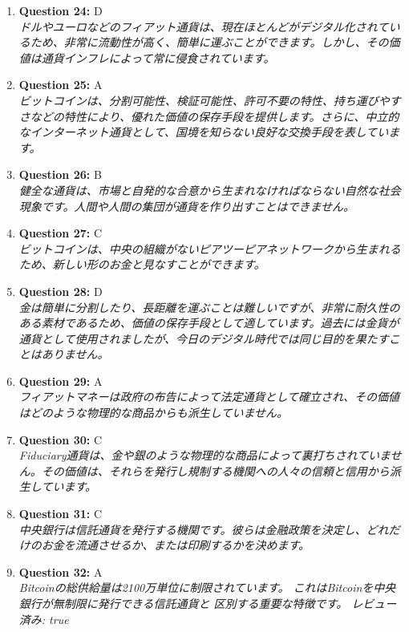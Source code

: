 \documentclass[12pt,a4paper]{article}
\begin{document}
\begin{enumerate}
\item \textbf{Question 24:} D
\\ \textit{ドルやユーロなどのフィアット通貨は、現在ほとんどがデジタル化されているため、非常に流動性が高く、簡単に運ぶことができます。しかし、その価値は通貨インフレによって常に侵食されています。}

\item \textbf{Question 25:} A
\\ \textit{ビットコインは、分割可能性、検証可能性、許可不要の特性、持ち運びやすさなどの特性により、優れた価値の保存手段を提供します。さらに、中立的なインターネット通貨として、国境を知らない良好な交換手段を表しています。}

\item \textbf{Question 26:} B
\\ \textit{健全な通貨は、市場と自発的な合意から生まれなければならない自然な社会現象です。人間や人間の集団が通貨を作り出すことはできません。}

\item \textbf{Question 27:} C
\\ \textit{ビットコインは、中央の組織がないピアツーピアネットワークから生まれるため、新しい形のお金と見なすことができます。}

\item \textbf{Question 28:} D
\\ \textit{金は簡単に分割したり、長距離を運ぶことは難しいですが、非常に耐久性のある素材であるため、価値の保存手段として適しています。過去には金貨が通貨として使用されましたが、今日のデジタル時代では同じ目的を果たすことはありません。}

\item \textbf{Question 29:} A
\\ \textit{フィアットマネーは政府の布告によって法定通貨として確立され、その価値はどのような物理的な商品からも派生していません。}

\item \textbf{Question 30:} C
\\ \textit{Fiduciary通貨は、金や銀のような物理的な商品によって裏打ちされていません。その価値は、それらを発行し規制する機関への人々の信頼と信用から派生しています。}

\item \textbf{Question 31:} C
\\ \textit{中央銀行は信託通貨を発行する機関です。彼らは金融政策を決定し、どれだけのお金を流通させるか、または印刷するかを決めます。}

\item \textbf{Question 32:} A
\\ \textit{Bitcoinの総供給量は2100万単位に制限されています。
これはBitcoinを中央銀行が無制限に発行できる信託通貨と
区別する重要な特徴です。
レビュー済み: true}


\end{enumerate}
\end{document}
